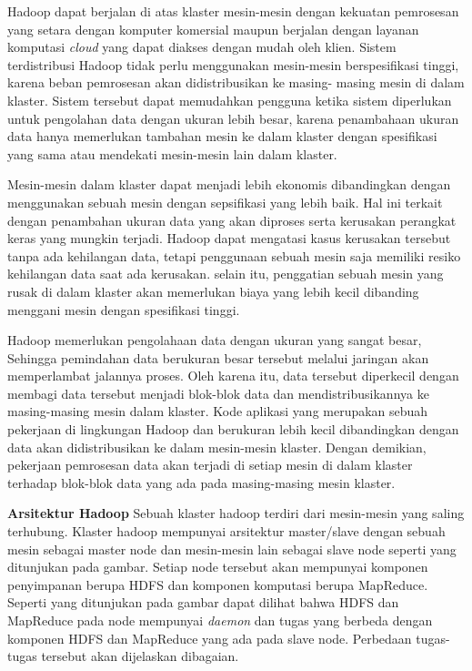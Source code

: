 \documentclass[a4paper,twoside]{article}
\begin{document}
\begin{enumerate}
{		Hadoop dapat berjalan di atas klaster mesin-mesin dengan kekuatan pemrosesan yang setara
		dengan komputer komersial maupun berjalan dengan layanan komputasi \textit{cloud}  yang
		dapat diakses dengan mudah oleh klien. Sistem terdistribusi Hadoop tidak perlu menggunakan
		mesin-mesin berspesifikasi tinggi, karena beban pemrosesan akan didistribusikan ke masing-				masing mesin di dalam klaster. Sistem tersebut dapat memudahkan pengguna ketika sistem
		diperlukan untuk pengolahan data dengan ukuran lebih besar, karena penambahaan ukuran data
		hanya memerlukan tambahan mesin ke dalam klaster dengan spesifikasi yang sama atau mendekati
 		mesin-mesin lain dalam klaster.

		Mesin-mesin dalam klaster dapat menjadi lebih ekonomis dibandingkan dengan menggunakan
		sebuah mesin dengan sepsifikasi yang lebih baik. Hal ini terkait dengan penambahan ukuran
		data yang akan diproses serta kerusakan perangkat keras yang mungkin terjadi. Hadoop dapat
		mengatasi kasus kerusakan tersebut tanpa ada kehilangan data, tetapi penggunaan sebuah mesin
		saja memiliki resiko kehilangan data saat ada kerusakan. selain itu, penggatian sebuah mesin
		yang rusak di dalam klaster akan memerlukan biaya yang lebih kecil dibanding menggani mesin
		dengan spesifikasi tinggi.

		Hadoop memerlukan pengolahaan data dengan ukuran yang sangat besar, Sehingga pemindahan data
		berukuran besar tersebut melalui jaringan akan memperlambat jalannya proses. Oleh karena
		itu, data tersebut diperkecil dengan membagi data tersebut menjadi blok-blok data dan
		mendistribusikannya ke masing-masing mesin dalam klaster. Kode aplikasi yang merupakan
		sebuah pekerjaan di lingkungan Hadoop dan berukuran lebih kecil dibandingkan dengan data
		akan didistribusikan ke dalam mesin-mesin klaster. Dengan demikian, pekerjaan pemrosesan
		data akan terjadi di setiap mesin di dalam klaster terhadap blok-blok data yang ada pada
		masing-masing mesin klaster.

		\textbf{Arsitektur Hadoop}\newline
		Sebuah klaster hadoop terdiri dari mesin-mesin yang saling terhubung. Klaster hadoop
		mempunyai arsitektur master/slave dengan sebuah mesin sebagai master node dan mesin-mesin
		lain sebagai slave node seperti yang ditunjukan pada gambar. Setiap node tersebut akan
		mempunyai komponen penyimpanan berupa HDFS dan komponen komputasi berupa MapReduce. Seperti
		yang ditunjukan pada gambar dapat dilihat bahwa HDFS dan MapReduce pada node mempunyai
	  	\textit{daemon} dan tugas yang berbeda dengan komponen HDFS dan MapReduce yang ada pada
	  	 slave node. Perbedaan tugas-tugas tersebut akan dijelaskan dibagaian.

}
\end{enumerate}
\end{document}
